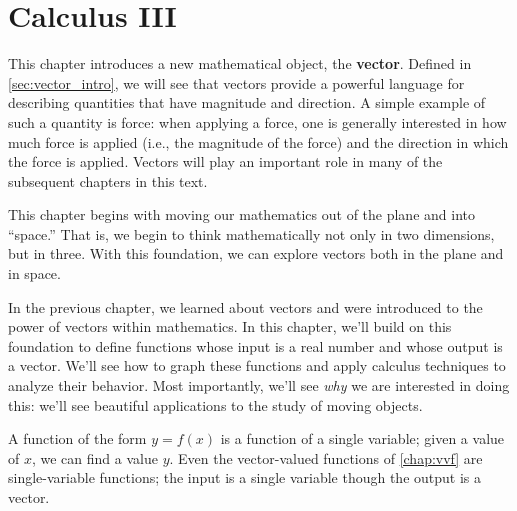 \part*[Calculus III]{Calculus III}\thispagestyle{empty}



This chapter introduces a new mathematical object, the \textbf{vector}. Defined in \autoref{sec:vector_intro}, we will see that vectors provide a powerful language for describing quantities that have magnitude and direction. A simple example of such a quantity is force: when applying a force, one is generally interested in how much force is applied (i.e., the magnitude of the force) and the direction in which the force is applied. Vectors will play an important role in many of the subsequent chapters in this text. 

This chapter begins with moving our mathematics out of the plane and into ``space.'' That is, we begin to think mathematically not only in two dimensions, but in three. With this foundation, we can explore vectors both in the plane and in space. 







%



In the previous chapter, we learned about vectors and were introduced to the power of vectors within mathematics. In this chapter, we'll build on this foundation to define functions whose input is a real number and whose output is a vector. We'll see how to graph these functions and apply calculus techniques to analyze their behavior. Most importantly, we'll see \textit{why} we are interested in doing this: we'll see beautiful applications to the study of moving objects.









A function of the form $y=f(x)$ is a function of a single variable; given a value of $x$, we can find a value $y$. Even the vector-valued functions of \autoref{chap:vvf} are single-variable functions; the input is a single variable though the output is a vector.

